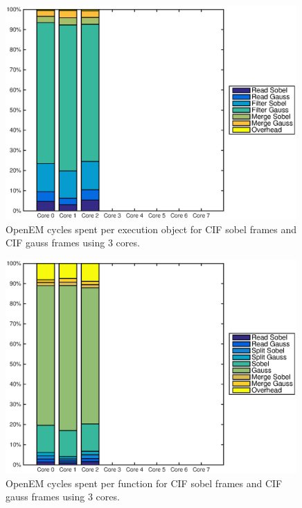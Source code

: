 \begin{figure}[h!]
    \begin{center}
        \includegraphics[width=0.99\textwidth]{images/openem_cifcif_3cores_eo.eps}
        \caption{OpenEM cycles spent per execution object for CIF sobel frames and CIF gauss frames using 3 cores.}
        \label{fig:oem3coreeo}
    \end{center}
\end{figure}

\begin{figure}[h!]
    \begin{center}
        \includegraphics[width=0.99\textwidth]{images/openem_cifcif_3cores_func.eps}
        \caption{OpenEM cycles spent per function for CIF sobel frames and CIF gauss frames using 3 cores.}
        \label{fig:oem3corefunc}
    \end{center}
\end{figure}


